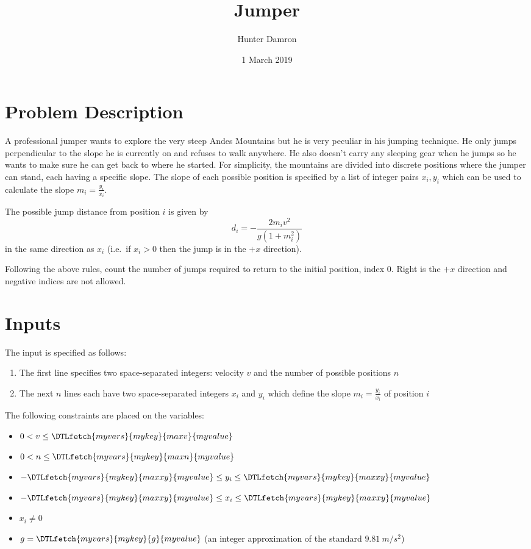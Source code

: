 \documentclass{article}
\title{Jumper}
\author{Hunter Damron}
\date{1 March 2019}
\newcommand{\var}[1]{\DTLfetch{myvars}{mykey}{#1}{myvalue}}
\begin{document}
	\maketitle

	\section*{Problem Description}
	\noindent
	A professional jumper wants to explore the very steep Andes Mountains but he is very peculiar in his jumping technique. He only jumps perpendicular to the slope he is currently on and refuses to walk anywhere. He also doesn't carry any sleeping gear when he jumps so he wants to make sure he can get back to where he started. For simplicity, the mountains are divided into discrete positions where the jumper can stand, each having a specific slope. The slope of each possible position is specified by a list of integer pairs $x_i, y_i$ which can be used to calculate the slope $m_i = \frac{y_i}{x_i}$.

	The possible jump distance from position $i$ is given by
	\[ d_i = -\frac{2 m_i v^2}{g (1+m_i^2)} \]
	in the same direction as $x_i$ (i.e.\ if $x_i > 0$ then the jump is in the $+x$ direction).

	Following the above rules, count the number of jumps required to return to the initial position, index 0. Right is the $+x$ direction and negative indices are not allowed.

	\section*{Inputs}
	The input is specified as follows:
	\begin{enumerate}
		\item The first line specifies two space-separated integers: velocity $v$ and the number of possible positions $n$
		\item The next $n$ lines each have two space-separated integers $x_i$ and $y_i$ which define the slope $m_i = \frac{y_i}{x_i}$ of position $i$
	\end{enumerate}

	\noindent
	The following constraints are placed on the variables:
	\begin{itemize}
		\item $0 < v \leq \var{maxv}$
		\item $0 < n \leq \var{maxn}$

        \item $-\var{maxxy} \leq y_i \leq \var{maxxy}$
		\item $-\var{maxxy} \leq x_i \leq \var{maxxy}$
		\item $x_i \neq 0$

		\item $g = \var{g}$ (an integer approximation of the standard $9.81~m/s^2$)
	\end{itemize}
\end{document}
